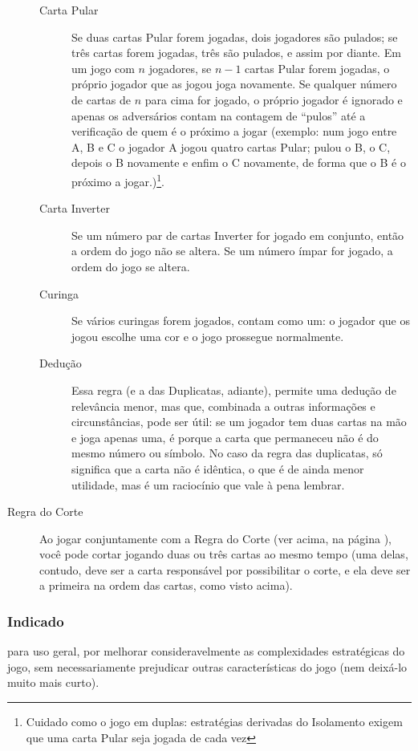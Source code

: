 \begin{description}
{\begin{description}
\item[Carta Pular]{Se duas cartas Pular forem jogadas, dois jogadores são pulados; se três cartas forem jogadas, três são pulados, e assim por diante. Em um jogo com $n$ jogadores, se $n - 1$ cartas Pular forem jogadas, o próprio jogador que as jogou joga novamente. Se qualquer número de cartas de $n$ para cima for jogado, o próprio jogador é ignorado e apenas os adversários contam na contagem de ``pulos'' até a verificação de quem é o próximo a jogar (exemplo: num jogo entre A, B e C o jogador A jogou quatro cartas Pular; pulou o B, o C, depois o B novamente e enfim o C novamente, de forma que o B é o próximo a jogar.)\footnote{Cuidado como o jogo em duplas: estratégias derivadas do Isolamento exigem que uma carta Pular seja jogada de cada vez}.}
\item[Carta Inverter]{Se um número par de cartas Inverter for jogado em conjunto, então a ordem do jogo não se altera. Se um número ímpar for jogado, a ordem do jogo se altera.}
\item[Curinga]{Se vários curingas forem jogados, contam como um: o jogador que os jogou escolhe uma cor e o jogo prossegue normalmente.}
\item[Dedução]{Essa regra (e a das Duplicatas, adiante), permite uma dedução de relevância menor, mas que, combinada a outras informações e circunstâncias, pode ser útil: se um jogador tem duas cartas na mão e joga apenas uma, é porque a carta que permaneceu não é do mesmo número ou símbolo. No caso da regra das duplicatas, só significa que a carta não é idêntica, o que é de ainda menor utilidade, mas é um raciocínio que vale à pena lembrar.}
\end{description}
}
\item[Regra do Corte]{Ao jogar conjuntamente com a Regra do Corte (ver acima, na página \pageref{regradocorte}), você pode cortar jogando duas ou três cartas ao mesmo tempo (uma delas, contudo, deve ser a carta responsável por possibilitar o corte, e ela deve ser a primeira na ordem das cartas, como visto acima).}
\end{description}

\subsubsection{Indicado} 

para uso geral, por melhorar consideravelmente as complexidades estratégicas do jogo, sem necessariamente prejudicar outras características do jogo (nem deixá-lo muito mais curto).

